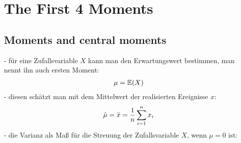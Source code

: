 \label{sec:moments}
\section{The First 4 Moments}

\subsection{Moments and central moments}
- für eine Zufallsvariable $X$ kann man den Erwartungswert bestimmen, man nennt ihn auch ersten Moment:
\begin{align}
    \mu = \mathbb{E}(X)\notag
\end{align}
- diesen schätzt man mit dem Mittelwert der realisierten Ereignisse $x$:
\begin{align}
    \hat{\mu} = \bar{x} = \frac{1}{n}\sum_{i=1}^{n}x_i\notag
\end{align}
- die Varianz als Maß für die Streuung der Zufallsvariable $X$, wenn $\mu=0$ ist:
